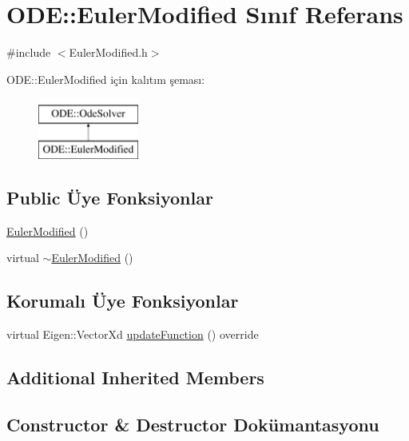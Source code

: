 \hypertarget{classODE_1_1EulerModified}{}\section{O\+DE\+::Euler\+Modified Sınıf Referans}
\label{classODE_1_1EulerModified}


{\ttfamily \#include $<$Euler\+Modified.\+h$>$}

O\+DE\+::Euler\+Modified için kalıtım şeması\+:\begin{figure}[H]
\begin{center}
\leavevmode
\includegraphics[height=2.000000cm]{classODE_1_1EulerModified}
\end{center}
\end{figure}
\subsection*{Public Üye Fonksiyonlar}
\begin{DoxyCompactItemize}
\item 
\mbox{\hyperlink{classODE_1_1EulerModified_a9a0379e71f13f1b2a3dd9c49bcc4f8d4}{Euler\+Modified}} ()
\item 
virtual \mbox{\hyperlink{classODE_1_1EulerModified_ae84b8cc0351af53819e0933adb7ffd1d}{$\sim$\+Euler\+Modified}} ()
\end{DoxyCompactItemize}
\subsection*{Korumalı Üye Fonksiyonlar}
\begin{DoxyCompactItemize}
\item 
virtual Eigen\+::\+Vector\+Xd \mbox{\hyperlink{classODE_1_1EulerModified_af318a33aabefccbf08f079d1d1600112}{update\+Function}} () override
\end{DoxyCompactItemize}
\subsection*{Additional Inherited Members}


\subsection{Constructor \& Destructor Dokümantasyonu}
\mbox{\label{classODE_1_1EulerModified_a9a0379e71f13f1b2a3dd9c49bcc4f8d4}} 
